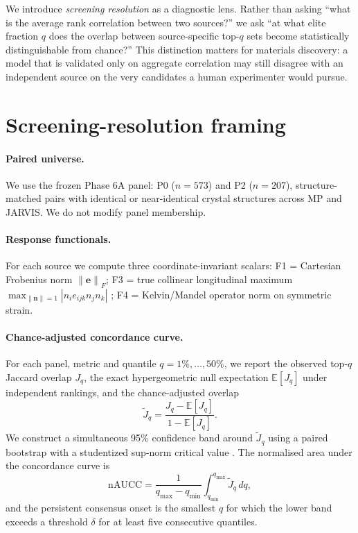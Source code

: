 \documentclass[11pt]{article}
\newcommand{\E}{\mathbf{e}}
\newcommand{\norm}[1]{\left\lVert #1 \right\rVert}
\begin{document}
We introduce \emph{screening resolution} as a diagnostic lens.
Rather than asking ``what is the average rank correlation between two sources?'' we ask ``at what elite fraction $q$ does the overlap between source-specific top-$q$ sets become statistically distinguishable from chance?''
This distinction matters for materials discovery: a model that is validated only on aggregate correlation may still disagree with an independent source on the very candidates a human experimenter would pursue.

\section{Screening-resolution framing}
\label{sec:methods}
\paragraph{Paired universe.}
We use the frozen Phase 6A panel: P0 ($n=573$) and P2 ($n=207$), structure-matched pairs with identical or near-identical crystal structures across MP and JARVIS.
We do not modify panel membership.

\paragraph{Response functionals.}
For each source we compute three coordinate-invariant scalars:
F1 = Cartesian Frobenius norm $\norm{\E}_F$;
F3 = true collinear longitudinal maximum $\max_{\norm{\bm n}=1} |n_i e_{ijk} n_j n_k|$ \cite{maxlongitudinal2021};
F4 = Kelvin/Mandel operator norm on symmetric strain.

\paragraph{Chance-adjusted concordance curve.}
For each panel, metric and quantile $q=1\%,\dots,50\%$, we report the observed top-$q$ Jaccard overlap $J_q$, the exact hypergeometric null expectation $\mathbb{E}[J_q]$ under independent rankings, and the chance-adjusted overlap
\begin{equation}
\widetilde J_q = \frac{J_q - \mathbb{E}[J_q]}{1 - \mathbb{E}[J_q]}.
\end{equation}
We construct a simultaneous 95\% confidence band around $\widetilde J_q$ using a paired bootstrap with a studentized sup-norm critical value \cite{efron1994,romano2005}.
The normalised area under the concordance curve is
\begin{equation}
\mathrm{nAUCC} = \frac{1}{q_{\max}-q_{\min}} \int_{q_{\min}}^{q_{\max}} \widetilde J_q \,dq,
\end{equation}
and the persistent consensus onset is the smallest $q$ for which the lower band exceeds a threshold $\delta$ for at least five consecutive quantiles.
\end{document}
